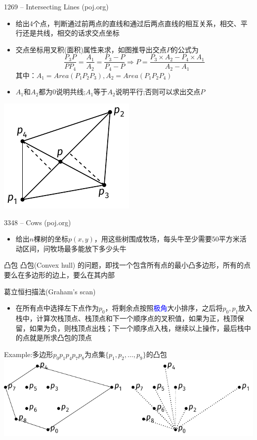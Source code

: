 \begin{frame}{1269 -- Intersecting Lines (poj.org)}
    \begin{itemize}
        \item 给出4个点，判断通过前两点的直线和通过后两点直线的相互关系，相交、平行还是共线，相交的话求交点坐标
        \item 交点坐标用叉积(面积)属性来求，如图推导出交点$P$的公式为
        $$\frac{P_3P}{PP_4}=\frac{A_1}{A_2}=\frac{P_3-P}{P_4-P}\Rightarrow P=\frac{P_3\times A_2-P_4\times A_1}{A_2-A_1}$$
        其中：$A_1=Area(P_1P_2P_3),A_2=Area(P_1P_2P_4)$
        \item $A_1$和$A_2$都为0说明共线;$A_1$等于$A_2$说明平行;否则可以求出交点$P$
    \end{itemize} 
    \includegraphics[center]{fig/9-6.pdf}
\end{frame}
\begin{frame}{3348 -- Cows (poj.org)}
    \begin{itemize}
        \item 给出$n$棵树的坐标$p(x,y)$，用这些树围成牧场，每头牛至少需要50平方米活动区间，问牧场最多能放下多少头牛
    \end{itemize} 
    \vfill
    \begin{block}{凸包}
        凸包(Convex hull) 的问题，即找一个包含所有点的最小凸多边形，所有的点要么在多边形的边上，要么在其内部
    \end{block}
\end{frame}
\begin{frame}{葛立恒扫描法(Graham's scan)}
    \begin{itemize}
        \item 在所有点中选择左下点作为$p_0$，将剩余点按照\textcolor{blue}{极角}大小排序，之后将$p_0,p_1$放入栈中，计算次栈顶点、栈顶点和下一个顺序点的叉积值，如果为正，栈顶保留，如果为负，则栈顶点出栈；下一个顺序点入栈，继续以上操作，最后栈中的点就是所求凸包的顶点
    \end{itemize}
    \begin{exampleblock}{Example:多边形$p_0p_1p_4p_7p_8$为点集$\{ p_1,p_2,\ldots ,p_9\}$的凸包}
        \includegraphics[scale=.95]{fig/9-7.pdf}
    \end{exampleblock}
\end{frame}
